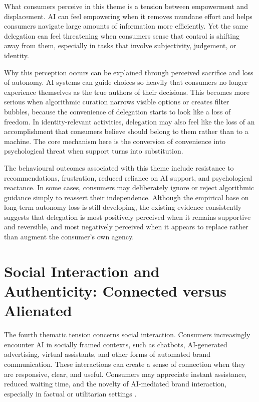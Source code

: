 What consumers perceive in this theme is a tension between empowerment and displacement. AI can feel empowering when it removes mundane effort and helps consumers navigate large amounts of information more efficiently. Yet the same delegation can feel threatening when consumers sense that control is shifting away from them, especially in tasks that involve subjectivity, judgement, or identity.

Why this perception occurs can be explained through perceived sacrifice and loss of autonomy. AI systems can guide choices so heavily that consumers no longer experience themselves as the true authors of their decisions. This becomes more serious when algorithmic curation narrows visible options or creates filter bubbles, because the convenience of delegation starts to look like a loss of freedom. In identity-relevant activities, delegation may also feel like the loss of an accomplishment that consumers believe should belong to them rather than to a machine. The core mechanism here is the conversion of convenience into psychological threat when support turns into substitution.

The behavioural outcomes associated with this theme include resistance to recommendations, frustration, reduced reliance on AI support, and psychological reactance. In some cases, consumers may deliberately ignore or reject algorithmic guidance simply to reassert their independence. Although the empirical base on long-term autonomy loss is still developing, the existing evidence consistently suggests that delegation is most positively perceived when it remains supportive and reversible, and most negatively perceived when it appears to replace rather than augment the consumer's own agency.

\section{Social Interaction and Authenticity: Connected versus Alienated}
The fourth thematic tension concerns social interaction. Consumers increasingly encounter AI in socially framed contexts, such as chatbots, AI-generated advertising, virtual assistants, and other forms of automated brand communication. These interactions can create a sense of connection when they are responsive, clear, and useful. Consumers may appreciate instant assistance, reduced waiting time, and the novelty of AI-mediated brand interaction, especially in factual or utilitarian settings \cite{ameen2021customer,chan2025genai}.

